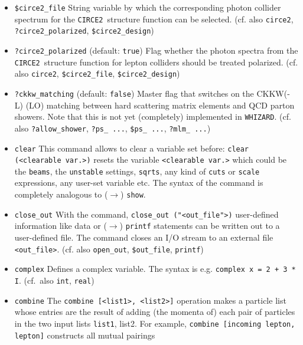 \documentclass[12pt]{book}
\newcommand{\ttt}[1]{\texttt{#1}}
\newcommand{\whizard}{\texttt{WHIZARD}}
\newcommand{\circetwo}{\texttt{CIRCE2}}
\begin{document}
\begin{itemize}
\ttt{circe2}, \ttt{\$circe2\_file}, \ttt{?circe2\_polarized})
\item
\ttt{\$circe2\_file} \newline
String variable by which the corresponding photon collider spectrum
for the \circetwo\ structure function can be selected. (cf. also
\ttt{circe2}, \ttt{?circe2\_polarized}, \ttt{\$circe2\_design})
\item
\ttt{?circe2\_polarized} \qquad (default: \ttt{true}) \newline
Flag whether the photon spectra from the \circetwo\ structure function
for lepton colliders should be treated polarized. (cf. also
\ttt{circe2}, \ttt{\$circe2\_file}, \ttt{\$circe2\_design})
\item
\ttt{?ckkw\_matching} \qquad (default: \ttt{false}) \newline
Master flag that switches on the CKKW(-L) (LO) matching between hard
scattering matrix elements and QCD parton showers. Note that this is
not yet (completely) implemented in \whizard. (cf. also
\ttt{?allow\_shower}, \ttt{?ps\_ ...}, \ttt{\$ps\_ ...}, \ttt{?mlm\_
  ...})  
\item
\ttt{clear} \newline
This command allows to clear a variable set before: \ttt{clear
(<clearable var.>)} resets the variable \ttt{<clearable var.>} which
could be the \ttt{beams}, the \ttt{unstable} settings, \ttt{sqrts},
any kind of \ttt{cuts} or \ttt{scale} expressions, any user-set
variable etc. The syntax of the command is completely analogous to
($\to$) \ttt{show}. 
\item
\ttt{close\_out} \newline
With the command, \ttt{close\_out ("<out\_file">)} user-defined
information like data or ($\to$) \ttt{printf} statements can be
written out to a user-defined file. The command closes an I/O stream to
an external file \ttt{<out\_file>}. (cf. also \ttt{open\_out},
\ttt{\$out\_file}, \ttt{printf})
\item
\ttt{complex} \newline
Defines a complex variable. The syntax is e.g. \ttt{complex x = 2 + 3
  * I}. (cf.~also \ttt{int}, \ttt{real})
\item
\ttt{combine} \newline
The \ttt{combine [<list1>, <list2>]} operation makes a particle list
whose entries are the result of adding (the momenta of) each pair of
particles in the two input lists \ttt{list1}, {list2}. For example,
\ttt{combine [incoming lepton, lepton]} constructs all mutual pairings

\end{itemize}
\end{document}
